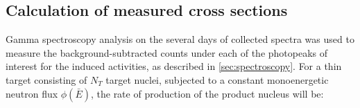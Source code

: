 \documentclass[5p]{elsarticle}
\newcommand{\pp}[1]{\left( #1\right)}
\begin{document}

\subsection{Calculation of measured cross sections}\label{sec:calcs_sec}


Gamma spectroscopy analysis on the several days of collected spectra was used to measure the background-subtracted counts under each of the photopeaks of interest for the induced activities, as described in \autoref{sec:spectroscopy}. For a thin target consisting of \(N_T\) target nuclei, subjected to a constant monoenergetic neutron flux $\phi\pp{\bar{E}}$, the rate of production of the product nucleus will be:
\end{document}
